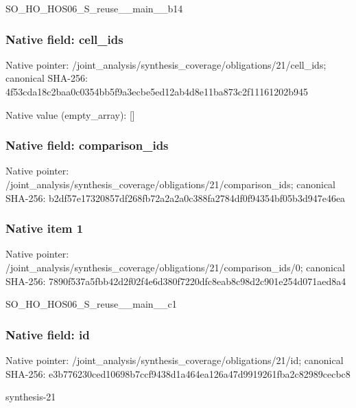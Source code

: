 \documentclass[10pt,a4paper]{article}
\begin{document}
\begingroup\raggedright\sloppy SO\_\allowbreak{}HO\_\allowbreak{}HOS06\_\allowbreak{}S\_\allowbreak{}reuse\_\allowbreak{}\_\allowbreak{}main\_\allowbreak{}\_\allowbreak{}b14\par\endgroup

\subsubsection{Native field: cell\_\allowbreak{}ids}
Native pointer: /joint\_\allowbreak{}analysis/synthesis\_\allowbreak{}coverage/obligations/21/cell\_\allowbreak{}ids; canonical SHA-256: 4f53cda18c2baa0c0354bb5f9a3ecbe5ed12ab4d8e11ba873c2f11161202b945

Native value (empty\_\allowbreak{}array): []

\subsubsection{Native field: comparison\_\allowbreak{}ids}
Native pointer: /joint\_\allowbreak{}analysis/synthesis\_\allowbreak{}coverage/obligations/21/comparison\_\allowbreak{}ids; canonical SHA-256: b2df57e17320857df268fb72a2a2a0c388fa2784df0f94354bf05b3d947e46ea

\subsubsection{Native item 1}
Native pointer: /joint\_\allowbreak{}analysis/synthesis\_\allowbreak{}coverage/obligations/21/comparison\_\allowbreak{}ids/0; canonical SHA-256: 7890f537a5fbb42d2f02f4e6d380f7220dfc8eab8c98d2c901e254d071aed8a4

\begingroup\raggedright\sloppy SO\_\allowbreak{}HO\_\allowbreak{}HOS06\_\allowbreak{}S\_\allowbreak{}reuse\_\allowbreak{}\_\allowbreak{}main\_\allowbreak{}\_\allowbreak{}c1\par\endgroup

\subsubsection{Native field: id}
Native pointer: /joint\_\allowbreak{}analysis/synthesis\_\allowbreak{}coverage/obligations/21/id; canonical SHA-256: e3b776230ced10698b7ccf9438d1a464ea126a47d9919261fba2c82989cecbc8

\begingroup\raggedright\sloppy synthesis-21\par\endgroup
\end{document}
